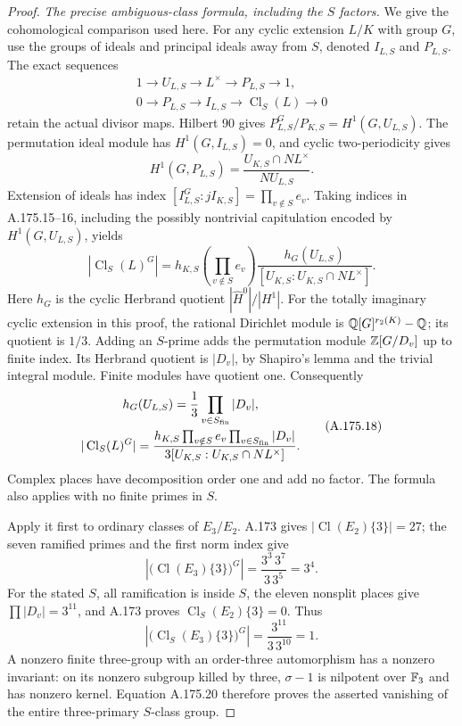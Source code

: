 \begin{proof}
\emph{The precise ambiguous-class formula, including the $S$ factors.}
We give the cohomological comparison used here.  For any cyclic
extension $L/K$ with group $G$, use the groups of ideals and
principal ideals away from $S$, denoted $I_{L,S}$ and $P_{L,S}$.
The exact sequences
\[
 \begin{gathered}
 1\longrightarrow U_{L,S}\longrightarrow L^\times
       \longrightarrow P_{L,S}\longrightarrow1,\\
 0\longrightarrow P_{L,S}\longrightarrow I_{L,S}
       \longrightarrow\operatorname{Cl}_S(L)\longrightarrow0
 \end{gathered}
\tag{A.175.15}
\]
retain the actual divisor maps.  Hilbert 90 gives
$P_{L,S}^G/P_{K,S}=H^1(G,U_{L,S})$.
The permutation ideal module has $H^1(G,I_{L,S})=0$, and cyclic
two-periodicity gives
\[
 H^1(G,P_{L,S})
       =\frac{U_{K,S}\cap N L^\times}{N U_{L,S}}.
\tag{A.175.16}
\]
Extension of ideals has index
$[I_{L,S}^G:jI_{K,S}]=\prod_{v\notin S}e_v$.
Taking indices in A.175.15--16, including the possibly nontrivial
capitulation encoded by $H^1(G,U_{L,S})$, yields
\[
 |\operatorname{Cl}_S(L)^G|
  =h_{K,S}\left(\prod_{v\notin S}e_v\right)
       \frac{h_G(U_{L,S})}
       {[U_{K,S}:U_{K,S}\cap N L^\times]}.
\tag{A.175.17}
\]
Here $h_G$ is the cyclic Herbrand quotient
$|\widehat H^0|/|H^1|$.
For the totally imaginary cyclic extension in this proof, the
rational Dirichlet module is
$\mathbb Q[G]^{r_2(K)}-\mathbb Q$; its quotient is $1/3$.
Adding an $S$-prime adds the permutation module $\mathbb Z[G/D_v]$
up to finite index.  Its Herbrand quotient is $|D_v|$, by Shapiro's
lemma and the trivial integral module.  Finite modules have quotient
one.  Consequently
\[
 \begin{gathered}
 h_G(U_{L,S})=\frac13\prod_{v\in S_{\rm fin}}|D_v|,
 \\
 |\operatorname{Cl}_S(L)^G|
 =\frac{h_{K,S}
     \prod_{v\notin S}e_v\prod_{v\in S_{\rm fin}}|D_v|}
        {3[U_{K,S}:U_{K,S}\cap N L^\times]}.
 \end{gathered}
\tag{A.175.18}
\]
Complex places have decomposition order one and add no factor.
The formula also applies with no finite primes in $S$.

Apply it first to ordinary classes of $E_3/E_2$.
A.173 gives $|\operatorname{Cl}(E_2)\{3\}|=27$; the seven
ramified primes and the first norm index give
\[
 \left|\bigl(\operatorname{Cl}(E_3)\{3\}\bigr)^G\right|
                   =\frac{3^3\,3^7}{3\,3^5}=3^4.
\tag{A.175.19}
\]
For the stated $S$, all ramification is inside $S$,
the eleven nonsplit places give $\prod|D_v|=3^{11}$,
and A.173 proves $\operatorname{Cl}_S(E_2)\{3\}=0$.
Thus
\[
 \left|\bigl(\operatorname{Cl}_S(E_3)\{3\}\bigr)^G\right|
                       =\frac{3^{11}}{3\,3^{10}}=1.
\tag{A.175.20}
\]
A nonzero finite three-group with an order-three automorphism has
a nonzero invariant: on its nonzero subgroup killed by three,
$\sigma-1$ is nilpotent over $\mathbb F_3$ and has nonzero kernel.
Equation A.175.20 therefore proves the asserted vanishing of the
entire three-primary $S$-class group.
\end{proof}

